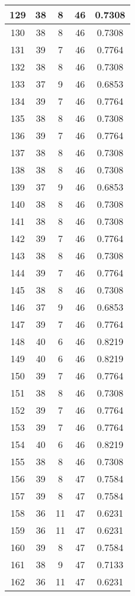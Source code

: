 \documentclass[letterpaper, 12pt]{article}
\begin{document}
\begin{longtable}{|c|c|c|c|c|}
\hline
129 & 38 & 8 & 46 & 0.7308 \\
\hline
130 & 38 & 8 & 46 & 0.7308 \\
\hline
131 & 39 & 7 & 46 & 0.7764 \\
\hline
132 & 38 & 8 & 46 & 0.7308 \\
\hline
133 & 37 & 9 & 46 & 0.6853 \\
\hline
134 & 39 & 7 & 46 & 0.7764 \\
\hline
135 & 38 & 8 & 46 & 0.7308 \\
\hline
136 & 39 & 7 & 46 & 0.7764 \\
\hline
137 & 38 & 8 & 46 & 0.7308 \\
\hline
138 & 38 & 8 & 46 & 0.7308 \\
\hline
139 & 37 & 9 & 46 & 0.6853 \\
\hline
140 & 38 & 8 & 46 & 0.7308 \\
\hline
141 & 38 & 8 & 46 & 0.7308 \\
\hline
142 & 39 & 7 & 46 & 0.7764 \\
\hline
143 & 38 & 8 & 46 & 0.7308 \\
\hline
144 & 39 & 7 & 46 & 0.7764 \\
\hline
145 & 38 & 8 & 46 & 0.7308 \\
\hline
146 & 37 & 9 & 46 & 0.6853 \\
\hline
147 & 39 & 7 & 46 & 0.7764 \\
\hline
148 & 40 & 6 & 46 & 0.8219 \\
\hline
149 & 40 & 6 & 46 & 0.8219 \\
\hline
150 & 39 & 7 & 46 & 0.7764 \\
\hline
151 & 38 & 8 & 46 & 0.7308 \\
\hline
152 & 39 & 7 & 46 & 0.7764 \\
\hline
153 & 39 & 7 & 46 & 0.7764 \\
\hline
154 & 40 & 6 & 46 & 0.8219 \\
\hline
155 & 38 & 8 & 46 & 0.7308 \\
\hline
156 & 39 & 8 & 47 & 0.7584 \\
\hline
157 & 39 & 8 & 47 & 0.7584 \\
\hline
158 & 36 & 11 & 47 & 0.6231 \\
\hline
159 & 36 & 11 & 47 & 0.6231 \\
\hline
160 & 39 & 8 & 47 & 0.7584 \\
\hline
161 & 38 & 9 & 47 & 0.7133 \\
\hline
162 & 36 & 11 & 47 & 0.6231 \\

\end{longtable}
\end{document}
